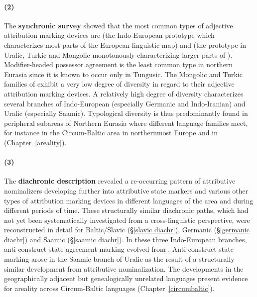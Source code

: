 \paragraph*{(2)}
The \textbf{synchronic survey} showed that the most common types of adjective attribution marking devices are  (the Indo\hyp{}European prototype which characterizes most parts of the European linguistic map) and  (the prototype in Uralic, Turkic and Mongolic monotonously characterizing larger parts of ). Modifier\hyp{}headed possessor agreement is the least common type in northern Eurasia since it is known to occur only in Tungusic. The Mongolic and Turkic families of  exhibit a very low degree of diversity in regard to their adjective attribution marking devices. A relatively high degree of diversity characterizes several branches of Indo-European (especially Germanic and Indo-Iranian) and Uralic (especially Saamic). Typological diversity is thus predominantly found in peripheral subareas of Northern Eurasia where different language families meet, for instance in the Circum-Baltic area in northernmost Europe and in  (Chapter~\ref{areality}).

\paragraph*{(3)}
The \textbf{diachronic description} revealed a re-occurring pattern of attributive nominalizers developing further into attributive state markers and various other types of attribution marking devices in different languages of the area and during different periods of time. These structurally similar diachronic paths, which had not yet been systematically investigated from a cross-linguistic perspective, were reconstructed in detail for Baltic\slash{}Slavic (\S\ref{slavic diachr}), Germanic (\S\ref{germanic diachr}) and Saamic (\S\ref{saamic diachr}). In these three Indo-European branches, anti\hyp{}construct state agreement marking evolved from . Anti\hyp{}construct state marking arose in the Saamic branch of Uralic as the result of a structurally similar development from attributive nominalization. The developments in the geographically adjacent but genealogically unrelated languages present evidence for areality across Circum-Baltic languages (Chapter~\ref{circumbaltic}).\\

